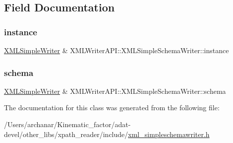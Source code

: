 \subsection{Field Documentation}
\mbox{\label{classXMLWriterAPI_1_1XMLSimpleSchemaWriter_acad25faff4c5f64554d85a075e232b19}} 
\subsubsection{\texorpdfstring{instance}{instance}}
{\footnotesize\ttfamily \mbox{\hyperlink{classXMLWriterAPI_1_1XMLSimpleWriter}{X\+M\+L\+Simple\+Writer}} \& X\+M\+L\+Writer\+A\+P\+I\+::\+X\+M\+L\+Simple\+Schema\+Writer\+::instance\hspace{0.3cm}{\ttfamily [protected]}}

\mbox{\label{classXMLWriterAPI_1_1XMLSimpleSchemaWriter_a97a86e85c4750599a68ab4a318c2d11d}} 
\subsubsection{\texorpdfstring{schema}{schema}}
{\footnotesize\ttfamily \mbox{\hyperlink{classXMLWriterAPI_1_1XMLSimpleWriter}{X\+M\+L\+Simple\+Writer}} \& X\+M\+L\+Writer\+A\+P\+I\+::\+X\+M\+L\+Simple\+Schema\+Writer\+::schema\hspace{0.3cm}{\ttfamily [protected]}}



The documentation for this class was generated from the following file\+:\begin{DoxyCompactItemize}
\item 
/\+Users/archanar/\+Kinematic\+\_\+factor/adat-\/devel/other\+\_\+libs/xpath\+\_\+reader/include/\mbox{\hyperlink{adat-devel_2other__libs_2xpath__reader_2include_2xml__simpleschemawriter_8h}{xml\+\_\+simpleschemawriter.\+h}}\end{DoxyCompactItemize}
